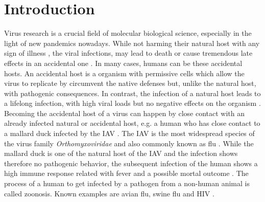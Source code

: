\chapter{Introduction} \label{chap:1}

Virus research is a crucial field of molecular biological science, especially in the light of new pandemics nowadays. While not harming their natural host with any sign of illness%
, the %
viral infections, may lead to death or cause tremendous late effects in an accidental one \autocite{accidential}. In many cases, humans can be these accidental hosts. %
An accidental %
host is a organism with permissive cells which allow the virus to replicate by circumvent the native defenses but, unlike the natural host, with pathogenic consequences. In contrast, the infection of a natural host leads to a lifelong infection, with high viral loads but no negative effects on the organism \autocite{accidential}. Becoming the accidental host of a virus can happen by close contact with an already infected natural or accidental host, e.g. a human who has close contact to a mallard duck infected by the \gls{IAV} \autocite{duck_natural}. The \gls{IAV} is the most widespread species of the virus family \textit{Orthomyxoviridae} and also commonly known as flu \autocite{influenza_all}. While the mallard duck is one of the natural host of the \gls{IAV} and the infection shows therefore no pathogenic behavior, the subsequent infection of the human shows a high immune response related with fever and a possible mortal outcome \autocite{infection}. The process of a human to get infected by a pathogen from a non-human animal is called zoonosis. Known examples are avian flu, swine flu and HIV \autocite{avian_swine, hiv}.

